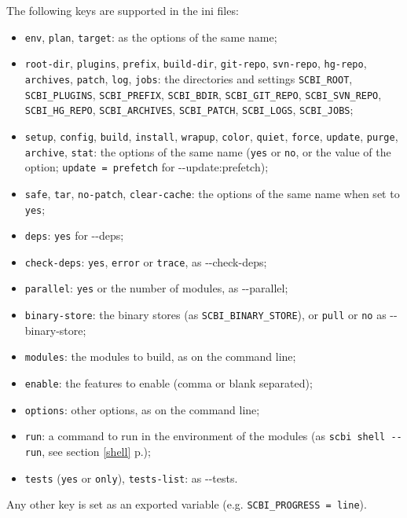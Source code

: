 \documentclass[a4paper,12pt,twoside]{article}
\newcommand{\code}[1]{\texttt{#1}}
\newcommand{\seeref}[1]{see section \ref{#1} p.\pageref{#1}}
\newcommand{\ddash}{-{}-}
\begin{document}
The following keys are supported in the ini files:

\begin{itemize}
	\item \code{env}, \code{plan}, \code{target}: as the options of the same name;
	\item \code{root-dir}, \code{plugins}, \code{prefix}, \code{build-dir}, \code{git-repo}, \code{svn-repo}, \code{hg-repo}, \code{archives}, \code{patch}, \code{log}, \code{jobs}: the directories and settings \code{SCBI\_ROOT}, \code{SCBI\_PLUGINS}, \code{SCBI\_PREFIX}, \code{SCBI\_BDIR}, \code{SCBI\_GIT\_REPO}, \code{SCBI\_SVN\_REPO}, \code{SCBI\_HG\_REPO}, \code{SCBI\_ARCHIVES}, \code{SCBI\_PATCH}, \code{SCBI\_LOGS}, \code{SCBI\_JOBS};
	\item \code{setup}, \code{config}, \code{build}, \code{install}, \code{wrapup}, \code{color}, \code{quiet}, \code{force}, \code{update}, \code{purge}, \code{archive}, \code{stat}: the options of the same name (\code{yes} or \code{no}, or the value of the option; \code{update = prefetch} for \ddash{}update:prefetch);
	\item \code{safe}, \code{tar}, \code{no-patch}, \code{clear-cache}: the options of the same name when set to \code{yes};
	\item \code{deps}: \code{yes} for \ddash{}deps;
	\item \code{check-deps}: \code{yes}, \code{error} or \code{trace}, as \ddash{}check-deps;
	\item \code{parallel}: \code{yes} or the number of modules, as \ddash{}parallel;
	\item \code{binary-store}: the binary stores (as \code{SCBI\_BINARY\_STORE}), or \code{pull} or \code{no} as \ddash{}binary-store;
	\item \code{modules}: the modules to build, as on the command line;
	\item \code{enable}: the features to enable (comma or blank separated);
	\item \code{options}: other options, as on the command line;
	\item \code{run}: a command to run in the environment of the modules (as \code{scbi shell \ddash{}run}, \seeref{shell});
	\item \code{tests} (\code{yes} or \code{only}), \code{tests-list}: as \ddash{}tests.
\end{itemize}

Any other key is set as an exported variable (e.g. \code{SCBI\_PROGRESS = line}).
\end{document}
